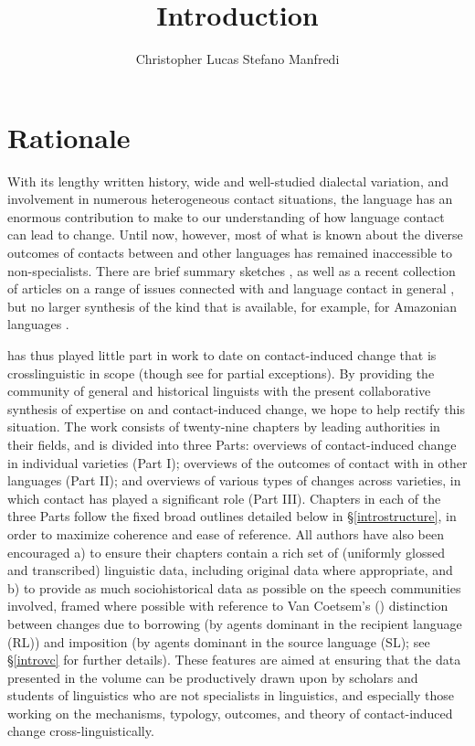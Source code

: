 \documentclass[output=paper]{langsci/langscibook}
\author{Christopher Lucas\affiliation{SOAS University of London}\lastand
 Stefano Manfredi\affiliation{CNRS, SeDyL}
}
\title{Introduction}
\begin{document}
\label{introintro}

\section{Rationale}
With its lengthy written history, wide and well-studied dialectal variation, and involvement in numerous heterogeneous contact situations, the  language has an enormous contribution to make to our understanding of how language contact can lead to change. Until now, however, most of what is known about the diverse outcomes of contacts between  and other languages has remained inaccessible to non-specialists. There are brief summary sketches \citep{Versteegh2001article,Versteegh2010,Thomason2011,Manfredi2018}, as well as a recent collection of articles on a range of issues connected with  and language contact in general \citep{ManfrediTosco2018}, but no larger synthesis of the kind that is available, for example, for Amazonian languages \citep{Aikhenvald2002}.

 has thus played little part in work to date on contact-induced change that is crosslinguistic in
scope (though see \citealt{Matras2009,Trudgill2011} for partial exceptions). By providing the community of general and historical linguists with the present collaborative synthesis of expertise on  and contact-induced change, we hope to help rectify this situation. The work consists of twenty-nine chapters by leading authorities in their fields, and is divided into three Parts: overviews of contact-induced change in individual  varieties (Part I); overviews of the outcomes of contact with  in other languages (Part II); and overviews of various types of changes across  varieties, in which contact has played a significant role (Part III). Chapters in each of the three Parts follow the fixed broad outlines detailed below in §\ref{introstructure}, in order to maximize coherence and ease of reference. All authors have also been encouraged a) to ensure their chapters contain a rich set of (uniformly glossed and transcribed) linguistic data, including original data where appropriate, and b) to provide as much sociohistorical data as possible on the speech communities involved, framed where possible with reference to Van Coetsem’s (\citeyear{VanCoetsem1988,VanCoetsem2000}) distinction between changes due to borrowing (by agents dominant in the {recipient language} ({RL})) and {imposition} (by agents dominant in the {source language} ({SL}); see §\ref{introvc} for further details). These features are aimed at ensuring that the data presented in the volume can be productively drawn upon by scholars and students of linguistics who are not specialists in
 linguistics, and especially those working on the mechanisms, typology, outcomes, and theory of contact-induced change cross-linguistically.
\end{document}
